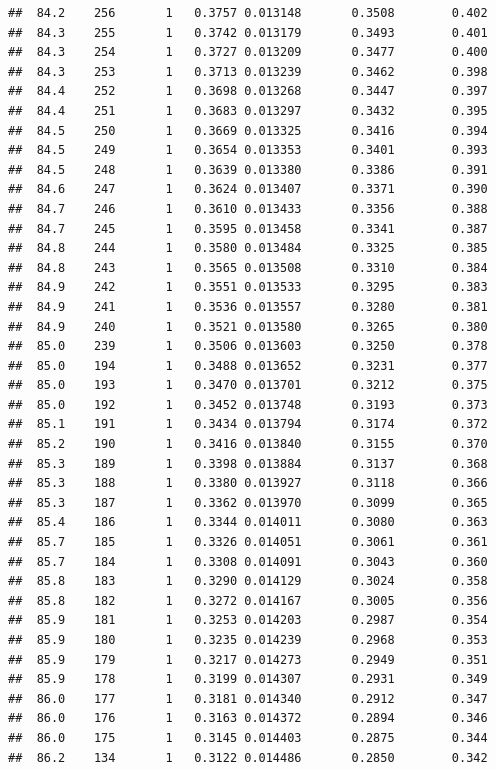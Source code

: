 \documentclass[
]{book}
\begin{document}
\begin{verbatim}
##  84.2    256       1   0.3757 0.013148       0.3508        0.402
##  84.3    255       1   0.3742 0.013179       0.3493        0.401
##  84.3    254       1   0.3727 0.013209       0.3477        0.400
##  84.3    253       1   0.3713 0.013239       0.3462        0.398
##  84.4    252       1   0.3698 0.013268       0.3447        0.397
##  84.4    251       1   0.3683 0.013297       0.3432        0.395
##  84.5    250       1   0.3669 0.013325       0.3416        0.394
##  84.5    249       1   0.3654 0.013353       0.3401        0.393
##  84.5    248       1   0.3639 0.013380       0.3386        0.391
##  84.6    247       1   0.3624 0.013407       0.3371        0.390
##  84.7    246       1   0.3610 0.013433       0.3356        0.388
##  84.7    245       1   0.3595 0.013458       0.3341        0.387
##  84.8    244       1   0.3580 0.013484       0.3325        0.385
##  84.8    243       1   0.3565 0.013508       0.3310        0.384
##  84.9    242       1   0.3551 0.013533       0.3295        0.383
##  84.9    241       1   0.3536 0.013557       0.3280        0.381
##  84.9    240       1   0.3521 0.013580       0.3265        0.380
##  85.0    239       1   0.3506 0.013603       0.3250        0.378
##  85.0    194       1   0.3488 0.013652       0.3231        0.377
##  85.0    193       1   0.3470 0.013701       0.3212        0.375
##  85.0    192       1   0.3452 0.013748       0.3193        0.373
##  85.1    191       1   0.3434 0.013794       0.3174        0.372
##  85.2    190       1   0.3416 0.013840       0.3155        0.370
##  85.3    189       1   0.3398 0.013884       0.3137        0.368
##  85.3    188       1   0.3380 0.013927       0.3118        0.366
##  85.3    187       1   0.3362 0.013970       0.3099        0.365
##  85.4    186       1   0.3344 0.014011       0.3080        0.363
##  85.7    185       1   0.3326 0.014051       0.3061        0.361
##  85.7    184       1   0.3308 0.014091       0.3043        0.360
##  85.8    183       1   0.3290 0.014129       0.3024        0.358
##  85.8    182       1   0.3272 0.014167       0.3005        0.356
##  85.9    181       1   0.3253 0.014203       0.2987        0.354
##  85.9    180       1   0.3235 0.014239       0.2968        0.353
##  85.9    179       1   0.3217 0.014273       0.2949        0.351
##  85.9    178       1   0.3199 0.014307       0.2931        0.349
##  86.0    177       1   0.3181 0.014340       0.2912        0.347
##  86.0    176       1   0.3163 0.014372       0.2894        0.346
##  86.0    175       1   0.3145 0.014403       0.2875        0.344
##  86.2    134       1   0.3122 0.014486       0.2850        0.342

\end{verbatim}
\end{document}
